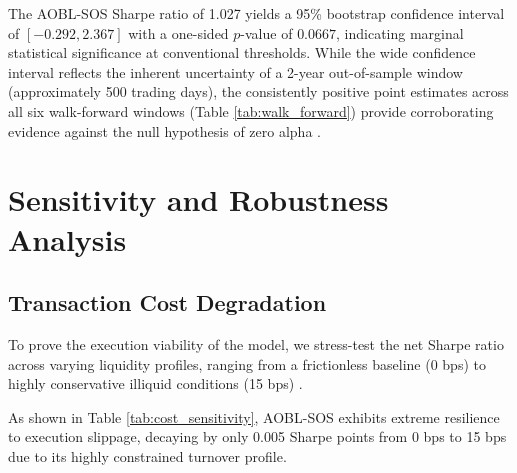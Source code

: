\documentclass[11pt,a4paper]{article}
\begin{document}
The AOBL-SOS Sharpe ratio of 1.027 yields a 95\% bootstrap confidence interval of $[-0.292, 2.367]$ with a one-sided $p$-value of $0.0667$, indicating marginal statistical significance at conventional thresholds. While the wide confidence interval reflects the inherent uncertainty of a 2-year out-of-sample window (approximately 500 trading days), the consistently positive point estimates across all six walk-forward windows (Table \ref{tab:walk_forward}) provide corroborating evidence against the null hypothesis of zero alpha \cite{lo1990}.

\section{Sensitivity and Robustness Analysis}

\subsection{Transaction Cost Degradation}
To prove the execution viability of the model, we stress-test the net Sharpe ratio across varying liquidity profiles, ranging from a frictionless baseline (0 bps) to highly conservative illiquid conditions (15 bps) \cite{garleanu2013}.

\begin{table}[htbp]
\centering
\caption{Net Sharpe Ratio Sensitivity to Trading Costs}
\label{tab:cost_sensitivity}
\end{table}

As shown in Table \ref{tab:cost_sensitivity}, AOBL-SOS exhibits extreme resilience to execution slippage, decaying by only 0.005 Sharpe points from 0 bps to 15 bps due to its highly constrained turnover profile.
\end{document}
